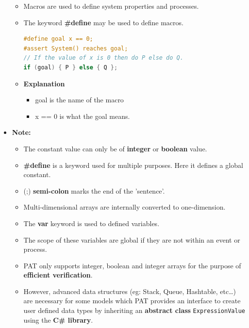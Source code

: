 \documentclass[10pt, landscape]{article}
\begin{document}
\begin{multicols*}{3}
\begin{itemize}
    \begin{itemize}
      \item Macros are used to define system properties and processes.
      \item The keyword \textbf{\#define} may be used to define macros.
\begin{lstlisting}[language=C]
#define goal x == 0;
#assert System() reaches goal;
// If the value of x is 0 then do P else do Q.
if (goal) { P } else { Q }; 
\end{lstlisting}
\item \textbf{Explanation}
\begin{itemize}
  \item goal is the name of the macro
  \item x == 0 is what the goal means.
\end{itemize}
    \end{itemize}
    \item \textbf{Note:}
    \begin{itemize}
      \item The constant value can only be of \textbf{integer} or \textbf{boolean} value.
      \item \textbf{\#define} is a keyword used for multiple purposes. Here it defines a global constant.
      \item (;) \textbf{semi-colon} marks the end of the 'sentence'.
      \item Multi-dimensional arrays are internally converted to one-dimension.
      \item The \textbf{var} keyword is used to defined variables.
      \item The scope of these variables are global if they are not within an event or process.
      \item PAT only supports integer, boolean and integer arrays for the purpose of \textbf{efficient verification}.
      \item However, advanced data structures (eg: Stack, Queue, Hashtable, etc\dots) are necessary for some models which PAT provides an interface to create user defined data types by inheriting an \textbf{abstract class} \texttt{ExpressionValue} using the \textbf{C\# library}.
    \end{itemize}
  \end{itemize}


\end{multicols*}
\end{document}
